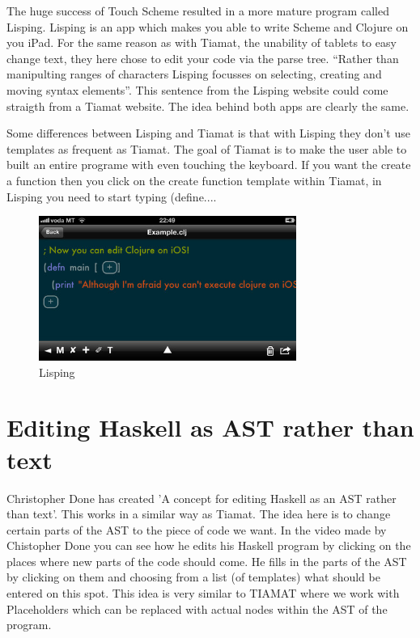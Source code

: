 \documentclass[a4paper,12pt]{report}
\begin{document}
The huge success of Touch Scheme resulted in a more mature program called Lisping. Lisping is an app which makes you able to write Scheme and Clojure on you iPad. For the same reason as with Tiamat, 
the unability of tablets to easy change text, they here chose to edit your code via the parse tree. ``Rather than manipulting ranges of characters Lisping focusses on selecting, creating and moving 
syntax elements''. This sentence from the Lisping website could come straigth from a Tiamat website. The idea behind both apps are clearly the same.

Some differences between Lisping and Tiamat is that with Lisping they don't use templates as frequent as Tiamat. The goal of Tiamat is to make the user able to built an entire programe with even touching the 
keyboard. If you want the create a function then you click on the create function template within Tiamat, in Lisping you need to start typing (define.... 
\begin{figure}
  \centering
    \includegraphics[width=0.75\textwidth]{images/lisping1.jpg}
  \caption{Lisping}
\end{figure}

\section{Editing Haskell as AST rather than text}
Christopher Done has created 'A concept for editing Haskell as an AST rather than text'. This works in a similar way as Tiamat. The idea here is to change certain parts of the AST to the piece of 
code we want. In the video made by Chistopher Done you can see how he edits his Haskell program by clicking on the places where new parts of the code should come. He fills in the parts of the AST
by clicking on them and choosing from a list (of templates) what should be entered on this spot.
This idea is very similar to TIAMAT where we work with Placeholders which can be replaced with actual nodes within the AST of the program.
\end{document}
